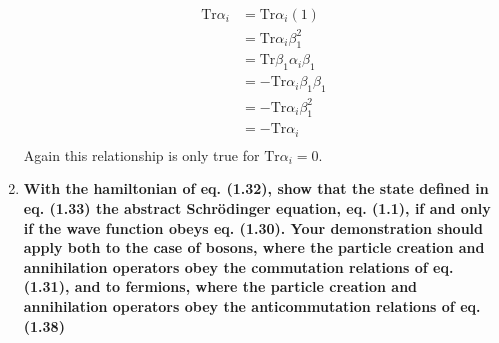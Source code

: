\documentclass[9pt]{report}
\begin{document}
\begin{enumerate}
  \[
    \begin{align}
      \text{Tr}\alpha_i &= \text{Tr}\alpha_i(1)\\
                        &= \text{Tr}\alpha_i\beta^2_1\\
                        &= \text{Tr}\beta_1\alpha_i\beta_1\\
                        &= -\text{Tr}\alpha_i\beta_1\beta_1\\
                        &= -\text{Tr}\alpha_i\beta_1^2\\
                        &= -\text{Tr}\alpha_i\\
    \end{align}
  \]
  Again this relationship is only true for $\text{Tr}\alpha_i = 0$.

\item \textbf{With the hamiltonian of eq. (1.32), show that the state defined in
  eq. (1.33) the abstract Schr\"{o}dinger equation, eq. (1.1), if and only if
  the wave function obeys eq. (1.30). Your demonstration should apply both to the
  case of bosons, where the particle creation and annihilation operators obey
  the commutation relations of eq. (1.31), and to fermions, where the particle
  creation and annihilation operators obey the anticommutation relations of
  eq. (1.38)}
\end{enumerate}
\end{document}
